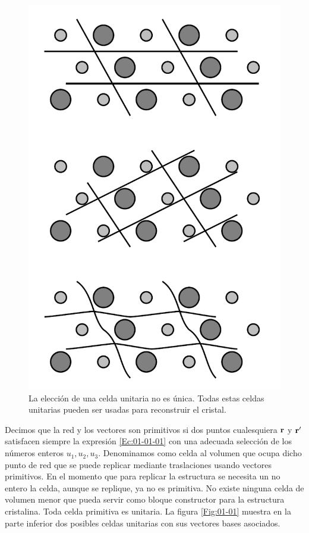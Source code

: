 \begin{figure}[h!] \centering
	\includegraphics[scale=0.38]{Cuerpo/Ch_01/Celda_unitaria.png}
	\caption{La elección de una celda unitaria no es única. Todas estas celdas unitarias pueden ser usadas para reconstruir el cristal.}
	\label{Fig:01-001}
\end{figure}

\begin{definition}
    Decimos que la red y los vectores son primitivos si dos puntos cualesquiera $\mathbf{r}$ y $\mathbf{r}'$ satisfacen siempre la expresión \ref{Ec:01-01-01} con una adecuada selección de los números enteros $u_1,u_2,u_3$. Denominamos como celda al volumen que ocupa dicho punto de red que se puede replicar mediante traslaciones usando vectores primitivos. En el momento que para replicar la estructura se necesita un no entero la celda, aunque se replique, ya no es primitiva. No existe ninguna celda de volumen menor que pueda servir como bloque constructor para la estructura cristalina. Toda celda primitiva es unitaria. La figura \ref{Fig:01-01} muestra en la parte inferior dos posibles celdas unitarias con sus vectores bases asociados.   
\end{definition}

